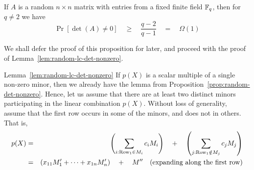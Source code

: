 \documentclass{birkjour}
\begin{document}
\begin{proposition}\label{prop:random-det-nonzero}
  If $A$ is a random $n\times n$ matrix with entries from a fixed
  finite field $\mathbb{F}_q$, then for $q\neq 2$ we have
$$
\Pr[\det(A) \neq 0] \quad\geq\quad \frac{q-2}{q-1} \quad=\quad\Omega(1)
$$
\end{proposition}

We shall defer the proof of this proposition for later, and proceed with the proof of Lemma~\ref{lem:random-lc-det-nonzero}. 

\begin{proofof}{Lemma~\ref{lem:random-lc-det-nonzero}}
  If $p(X)$ is a scalar multiple of a single non-zero minor, then we
  already have the lemma from
  Proposition~\ref{prop:random-det-nonzero}. Hence, let us assume that
  there are at least two distinct minors participating in the linear
  combination $p(X)$. Without loss of generality, assume that the
  first row occurs in some of the minors, and does not in others. That is, 
  \begin{eqnarray*}
    p(X) &=& \left(\sum_{i:\text{Row}_1\in M_i} c_i M_i\right) \quad+ \quad \left(\sum_{j:\text{Row}_1\notin M_j} c_j M_j\right)\\
     & = & \left(x_{11} M_1' + \dots + x_{1n} M_{n}'\right) \quad+\quad M'' \quad\text{(expanding along the first row)}
  \end{eqnarray*}


\end{proofof}
\end{document}
